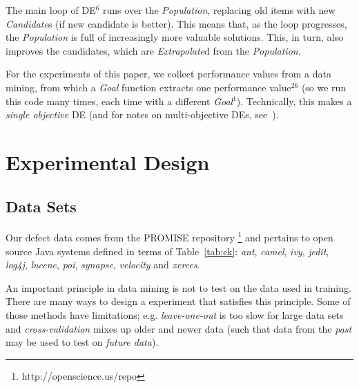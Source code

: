 \documentclass{sig-alternative}
\newcommand{\tab}[1]{Table~\ref{tab:#1}}
\begin{document}
The main loop of DE$^{6}$ runs over the {\em Population}, replacing old items
with new {\em Candidate}s (if  new candidate is better).
This means that, as the loop progresses, the {\em Population} is full of increasingly
more valuable solutions. This, in turn, also improves  the candidates, which are {\em Extrapolate}d
from the {\em Population}.

For the experiments of this paper, we collect performance
values from a data mining, from which a {\em Goal} function extracts one 
performance value$^{26}$ (so we run this code many times, each time with
a different {\em Goal}$^{1}$).  Technically, this makes a  {\em single objective} DE (and for notes on multi-objective DEs, see~\cite{Coello05,zhang07,5583335}).






\section{Experimental Design}\label{sect:design}
 

\subsection{Data Sets}\label{sect:dataa}

Our defect data comes from the PROMISE repository \footnote{http://openscience.us/repo}
and pertains to 
open source Java systems defined in terms of \tab{ck}:  {\it ant}, {\it camel}, {\it ivy}, {\it jedit}, {\it log4j}, {\it lucene},
{\it poi}, {\it synapse}, {\it velocity} and {\it xerces}. 

An important principle in data mining is not to test on the data used
in training.  There are many ways to design a experiment that satisfies this principle.
Some of those methods have  limitations; e.g.
{\em leave-one-out} is too slow for large data sets and
{\em cross-validation} mixes up older and newer data  (such that
data from the {\em past} may be used to test on {\em future data}).
\end{document}

